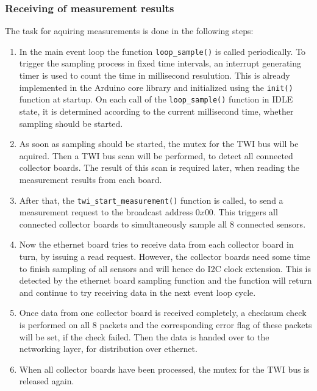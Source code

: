 \documentclass[a4paper]{scrreprt}
\begin{document}
\subsubsection{Receiving of measurement results}
The task for aquiring measurements is done in the following steps:
\begin{enumerate}
  \item In the main event loop the function \texttt{loop\_sample()} is called periodically. To trigger the sampling process in fixed time
    intervals, an interrupt generating timer is used to count the time in millisecond resulution. This is already implemented in the Arduino core library
    and initialized using the \texttt{init()} function at startup.
    On each call of the \texttt{loop\_sample()} function in IDLE state, it is determined according to the current millisecond time,
    whether sampling should be started.
  \item As soon as sampling should be started, the mutex for the TWI bus will be aquired. Then a TWI bus scan will be performed, to detect
    all connected collector boards. The result of this scan is required later, when reading the measurement results from each board.
  \item After that, the \texttt{twi\_start\_measurement()} function is called, to send a measurement request to the broadcast address $0x00$.
    This triggers all connected collector
    boards to simultaneously sample all 8 connected sensors.
  \item Now the ethernet board tries to receive data from each collector board in turn, by issuing a read request. However, the collector boards
    need some time to finish sampling of all sensors and will hence do I2C clock extension. This is detected by the ethernet board
    sampling function and the function will return and continue to try receiving data in the next event loop cycle.
  \item Once data from one collector board is received completely, a checksum check is performed on all 8 packets and the corresponding error flag of these packets will be set, if the check failed. Then the data is
    handed over to the networking layer, for distribution over ethernet.
  \item When all collector boards have been processed, the mutex for the TWI bus is released again.
\end{enumerate}
\end{document}
